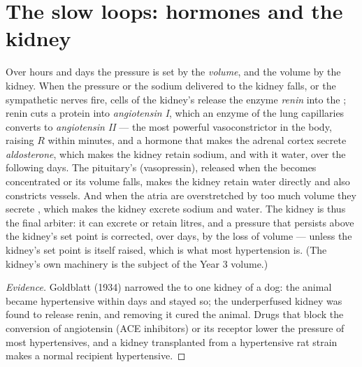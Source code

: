 \section{The slow loops: hormones and the kidney}

\begin{proposition}\label{prop:b2:blood-pressure:raas}
Over hours and days the pressure is set by the \emph{ volume},
and the volume by the kidney. When the pressure or the sodium
delivered to the kidney falls, or the sympathetic nerves fire, cells
of the kidney's  release the enzyme \emph{renin} into the
; renin cuts a  protein into \emph{angiotensin I}, which
an enzyme of the lung capillaries converts to \emph{angiotensin II}
--- the most powerful vasoconstrictor in the body, raising $R$ within
minutes, and a hormone that makes the adrenal cortex secrete
\emph{aldosterone}, which makes the kidney retain sodium, and with
it water, over the following days. The pituitary's
\emph{} (vasopressin), released when the 
becomes concentrated or its volume falls, makes the kidney retain
water directly and also constricts vessels. And when the atria are
overstretched by too much volume they secrete \emph{}, which makes the kidney excrete sodium and water. The
kidney is thus the final arbiter: it can excrete or retain litres,
and a pressure that persists above the kidney's set point is
corrected, over days, by the loss of volume --- unless the kidney's
set point is itself raised, which is what most hypertension is.
(The kidney's own machinery is the subject of the Year 3 volume.)
\end{proposition}
\begin{proof}[Evidence]
Goldblatt (1934) narrowed the  to one kidney of a dog: the
animal became hypertensive within days and stayed so; the
underperfused kidney was found to release renin, and removing it
cured the animal. Drugs that block the conversion of angiotensin
(ACE inhibitors) or its receptor lower the pressure of most
hypertensives, and a kidney transplanted from a hypertensive rat
strain makes a normal recipient hypertensive.
\end{proof}

